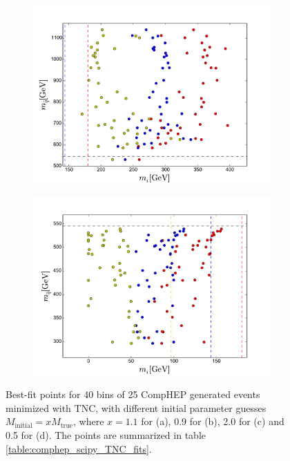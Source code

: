 \documentclass[twoside,english]{uiofysmaster}
\begin{document}
\begin{figure}[hbt]
	\begin{subfigure}[b]{0.49\textwidth}
		\includegraphics[width=\textwidth]{figures/comphep_scipy_TNC_fit_2p0_initial_guess.pdf} 
		\caption{}
		\label{fig:comphep_scipy_TNC_fits3}
	\end{subfigure}
	\begin{subfigure}[b]{0.49\textwidth}
		\includegraphics[width=\textwidth]{figures/comphep_scipy_TNC_fit_0p5_initial_guess.pdf} 
		\caption{}
		\label{fig:comphep_scipy_TNC_fits4}
	\end{subfigure}
	\caption{Best-fit points for 40 bins of 25 CompHEP generated events minimized with TNC, with different initial parameter guesses $M_\mathrm{initial} = x M_\mathrm{true}$, where $x = 1.1$ for (a), 0.9 for (b), 2.0 for (c) and 0.5 for (d). The points are summarized in table \ref{table:comphep_scipy_TNC_fits}.}
	\label{fig:comphep_scipy_TNC_fits}
\end{figure} 
\end{document}
